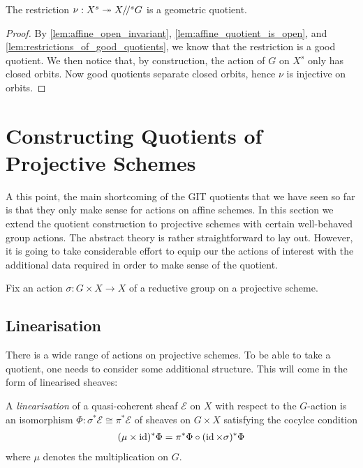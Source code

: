 \documentclass[12pt]{ociamthesis}  %
\begin{document}
\begin{theorem}\label{thm:affine_quotient_is_geometric}
  The restriction $\nu : X^s \twoheadrightarrow X/\!/^s G$ is a geometric quotient.
  \begin{proof}
    By \ref{lem:affine_open_invariant}, \ref{lem:affine_quotient_is_open},
    and \ref{lem:restrictions_of_good_quotients}, we know that
    the restriction is a good quotient. We then notice that, by construction,
    the action of $G$ on $X^s$ only has closed orbits. Now good
    quotients separate closed orbits, hence $\nu$ is injective on orbits.
  \end{proof}
\end{theorem}

\missingsection

\section{Constructing Quotients of Projective Schemes}

A this point, the main shortcoming of the GIT quotients that
we have seen so far is that they only make sense for actions on
affine schemes. In this section we extend the quotient construction
to projective schemes with certain well-behaved group actions.
The abstract theory is rather straightforward to lay out. However,
it is going to take considerable effort to equip our the actions of interest
with the additional data required in order to make sense of the quotient.

Fix an action $\sigma : G\times X\to X$ of a reductive
group on a projective scheme.

\subsection{Linearisation}

There is a wide range of actions on projective schemes. To be able to
take a quotient, one needs to consider some additional structure. This
will come in the form of linearised sheaves:

\begin{definition}
  A \emph{linearisation} of a quasi-coherent sheaf
  $\mathscr E$ on $X$ with respect to the $G$-action
  is an isomorphism $\Phi : \sigma^*\mathscr E \cong\pi^*\mathscr E$
  of sheaves on $G\times X$ satisfying the cocylce condition
  \begin{align}\label{eq:cocyle_condition}
    (\mu \times \operatorname{id})^*\Phi = \pi^*\Phi \circ (\operatorname{id}\times\sigma)^*\Phi
  \end{align}
  where $\mu$ denotes the multiplication on $G$.
\end{definition}
\end{document}
